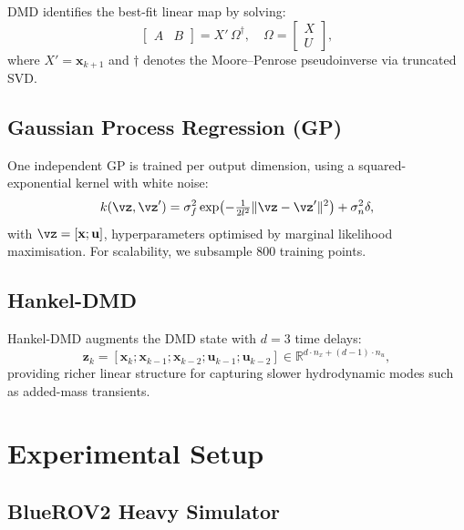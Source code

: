 \documentclass[conference]{IEEEtran}
\newcommand{\vx}{\mathbf{x}}
\newcommand{\vu}{\mathbf{u}}
\newcommand{\Rn}[1]{\mathbb{R}^{#1}}
\begin{document}
DMD identifies the best-fit linear map by solving:
\begin{equation}
  \begin{bmatrix}A & B\end{bmatrix} =
  X'\,\Omega^\dagger, \quad \Omega = \begin{bmatrix}X\\U\end{bmatrix},
\end{equation}
where $X' = \vx_{k+1}$ and $\dagger$ denotes the Moore–Penrose pseudoinverse
via truncated SVD.

\subsection{Gaussian Process Regression (GP)}

One independent GP is trained per output dimension, using a squared-exponential
kernel with white noise:
\begin{equation}
  k(\vz, \vz') = \sigma_f^2 \exp\!\left(-\tfrac{1}{2l^2}\|\vz-\vz'\|^2\right) + \sigma_n^2\delta,
\end{equation}
with $\vz = [\vx;\vu]$, hyperparameters optimised by marginal likelihood
maximisation. For scalability, we subsample 800 training points.

\subsection{Hankel-DMD}

Hankel-DMD augments the DMD state with $d=3$ time delays:
\begin{equation}
  \mathbf{z}_k = [\vx_k; \vx_{k-1}; \vx_{k-2}; \vu_{k-1}; \vu_{k-2}]
  \in \Rn{d\cdot n_x + (d-1)\cdot n_u},
\end{equation}
providing richer linear structure for capturing slower hydrodynamic modes
such as added-mass transients.

\section{Experimental Setup}
\label{sec:experiments}

\subsection{BlueROV2 Heavy Simulator}
\end{document}
